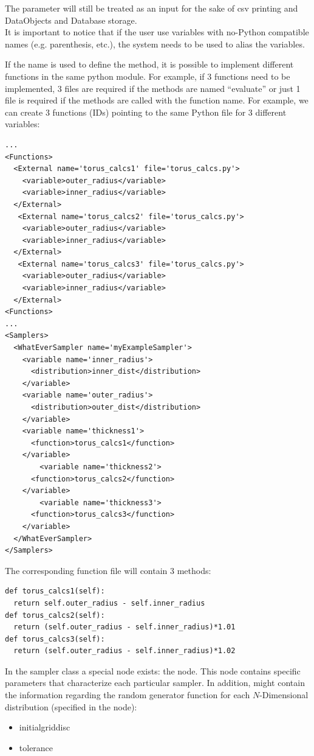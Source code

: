 The  parameter will still be treated as an input for the sake of csv
printing and DataObjects and Database storage.
\\\nb It is important to notice that if the user use variables with no-Python compatible names (e.g. parenthesis, etc.),
the  system needs to be used to alias the variables.

If the   name is used to define the method, it is possible to implement different functions
in the same python module. For example, if 3 functions need to be implemented, 3 files are required if
the methods are named ``evaluate'' or just 1 file is required if the methods are called with the function name.
For example, we can create 3 functions (IDs) pointing to the same Python file for 3 different variables:
\begin{lstlisting}[style=XML]
...
<Functions>
  <External name='torus_calcs1' file='torus_calcs.py'>
    <variable>outer_radius</variable>
    <variable>inner_radius</variable>
  </External>
   <External name='torus_calcs2' file='torus_calcs.py'>
    <variable>outer_radius</variable>
    <variable>inner_radius</variable>
  </External>
   <External name='torus_calcs3' file='torus_calcs.py'>
    <variable>outer_radius</variable>
    <variable>inner_radius</variable>
  </External>
<Functions>
...
<Samplers>
  <WhatEverSampler name='myExampleSampler'>
    <variable name='inner_radius'>
      <distribution>inner_dist</distribution>
    </variable>
    <variable name='outer_radius'>
      <distribution>outer_dist</distribution>
    </variable>
    <variable name='thickness1'>
      <function>torus_calcs1</function>
    </variable>
        <variable name='thickness2'>
      <function>torus_calcs2</function>
    </variable>
        <variable name='thickness3'>
      <function>torus_calcs3</function>
    </variable>
  </WhatEverSampler>
</Samplers>
\end{lstlisting}
The corresponding function file  will contain 3 methods: 
\begin{lstlisting}
def torus_calcs1(self):
  return self.outer_radius - self.inner_radius
def torus_calcs2(self):
  return (self.outer_radius - self.inner_radius)*1.01
def torus_calcs3(self):
  return (self.outer_radius - self.inner_radius)*1.02
\end{lstlisting}

In the sampler class a special node exists: the  node.
This node contains specific parameters that characterize each particular sampler.
In addition,  might contain the information regarding the random generator function for each $N$-Dimensional distribution (specified in the  node):
\begin{itemize}
\item initial\textunderscore grid\textunderscore disc
\item tolerance
\end{itemize}

